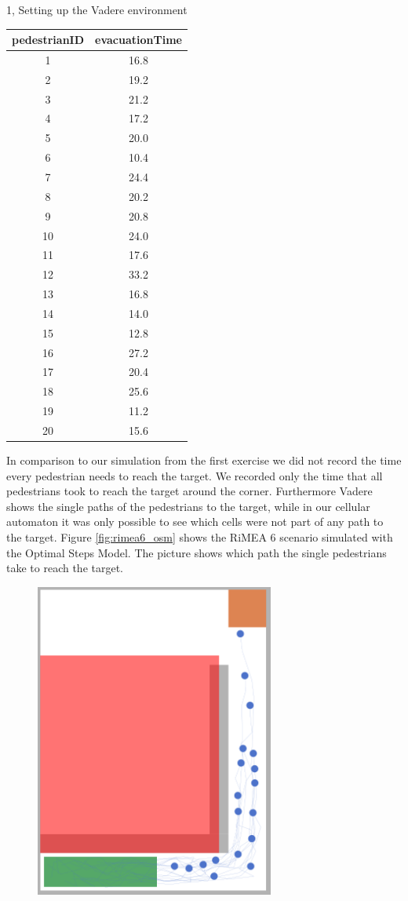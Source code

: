 \documentclass[10pt,a4paper]{article}
\begin{document}
\begin{task}{1, Setting up the Vadere environment}
\begin{itemize}
    \bigbreak
    \begin{tabular}{c|c}
    pedestrianID& evacuationTime\\
    \hline
    1& 16.8  \\
    2& 19.2 \\
    3& 21.2\\
    4&17.2\\
    5&20.0\\
    6&10.4\\
    7&24.4\\
    8&20.2\\
    9&20.8\\
    10&24.0\\
    11&17.6\\
    12&33.2\\
    13&16.8\\
    14&14.0\\
    15&12.8\\
    16&27.2\\
    17&20.4\\
    18&25.6\\
    19&11.2\\
    20&15.6\\
    \end{tabular}
    \bigbreak
    In comparison to our simulation from the first exercise we did not record the time every pedestrian needs to reach the target. We recorded only the time that all pedestrians took to reach the target around the corner. Furthermore Vadere shows the single paths of the pedestrians to the target, while in our cellular automaton it was only possible to see which cells were not part of any path to the target. Figure \ref{fig:rimea6_osm} shows the RiMEA 6 scenario simulated with the Optimal Steps Model. The picture shows which path the single pedestrians take to reach the target.
    \begin{figure}[H]
        \centering
        \includegraphics[width=0.7\textwidth]{pictures/osm/rimeatest6.png}

\end{figure}
\end{itemize}
\end{task}
\end{document}
